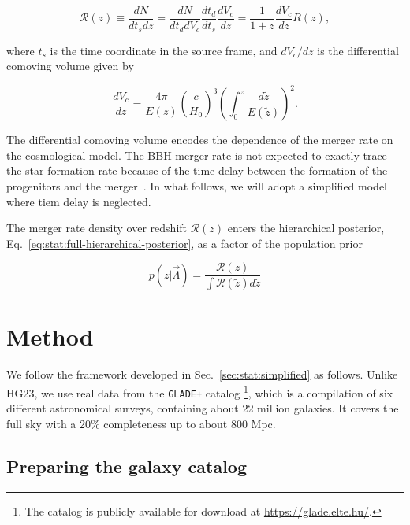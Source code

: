 \documentclass[%
preprint,
nofootinbib,
 amsmath,amssymb,
 aps,
]{revtex4-2}
\newcommand{\given}[2]{p( #1 | #2 )}
\newcommand{\pa}[1]{\left(#1\right)}
\begin{document}
\begin{equation}
	\mathcal{R}(z) \equiv \frac{dN}{dt_s dz} = \frac{dN}{dt_d dV_c} \frac{dt_d}{dt_s} \frac{dV_c}{dz} = \frac{1}{1 + z} \frac{dV_c}{dz} R(z),
\end{equation}

where $t_s$ is the time coordinate in the source frame, and $dV_c /dz$ is the differential comoving
volume given by

\begin{equation}
	\frac{dV_c}{dz} =  \frac{4 \pi }{E(z)}\pa{\frac{c}{H_0}}^3 \pa{\int_0^z \frac{d\tilde{z}}{E(\tilde{z})}}^2.
\end{equation}

The differential comoving volume encodes the dependence of the merger rate on the cosmological
model. The BBH merger rate is not expected to exactly trace the star formation rate because of the
time delay between the formation of the progenitors and the
merger~\cite{santoliquido_cosmic_2020,fishbach_time_2021,van_son_redshift_2022}. In what follows,
we will adopt a simplified model where tiem delay is neglected.

The merger rate density over redshift $\mathcal{R}(z)$ enters the hierarchical posterior,
Eq.~\eqref{eq:stat:full-hierarchical-posterior}, as a factor of the population prior

\begin{equation}
	\given{z}{\vec{\Lambda}} = \frac{\mathcal{R}(z)}{\int \mathcal{R}(\tilde{z}) d\tilde{z}}
\end{equation}

\section{Method}
\label{sec:method}

We follow the framework developed in Sec.~\ref{sec:stat:simplified} as follows. Unlike HG23, we use
real data from the \texttt{GLADE+} catalog \cite{D_lya_2018,D_lya_2022} \footnote{The catalog is
	publicly available for download at \url{https://glade.elte.hu/}.}, which is a compilation of six
different astronomical surveys, containing about 22 million galaxies. It covers the full sky with a
20\% completeness up to about 800 Mpc.

\subsection{Preparing the galaxy catalog}
\end{document}
